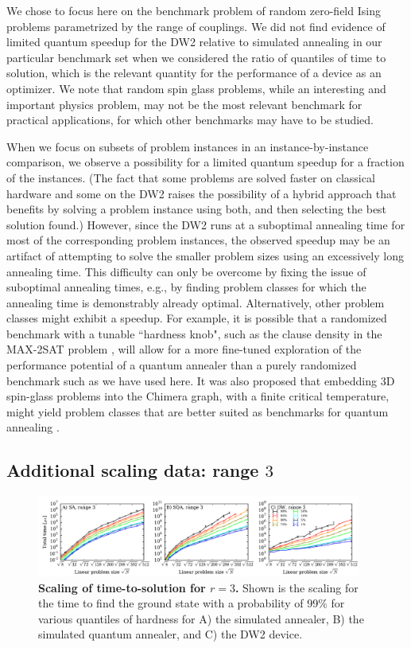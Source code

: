 We chose to focus here on the benchmark problem of random zero-field Ising problems parametrized by the range of couplings.
We did not find evidence of limited quantum speedup for the DW2 relative to simulated annealing in our particular benchmark set when we considered the ratio of quantiles of time to solution, which is the relevant quantity for the performance of a device as an optimizer. We note that random spin glass problems, while an interesting and important physics problem, may not be the most relevant benchmark for practical applications, for which other benchmarks may have to be studied.

When we focus on subsets of problem instances in an instance-by-instance comparison, we observe a possibility for a limited quantum speedup for a fraction of the instances. (The fact that some problems are solved faster on classical hardware and some on the DW2 raises the possibility of a hybrid approach that benefits by solving a problem instance using both, and then selecting the best solution found.) However, since the DW2 runs at a suboptimal annealing time for most of the corresponding problem instances, the observed speedup may be an artifact of attempting to solve the smaller problem sizes using  an excessively long annealing time. This difficulty can only be overcome by fixing the issue of suboptimal annealing times, e.g., by finding problem classes for which the annealing time is demonstrably already optimal.
Alternatively, other problem classes might exhibit a speedup. For example, it is possible that a randomized benchmark with a tunable ``hardness knob", such as the clause density in the MAX-2SAT problem \cite{MAX2SAT}, will allow for a more fine-tuned exploration of the performance potential of a quantum annealer than a purely randomized benchmark such as we have used here. It was also proposed that embedding 3D spin-glass problems into the Chimera graph, with a finite critical temperature, might yield problem classes that are better suited as benchmarks for quantum annealing \cite{2014Katzgraber}.

\subsection{Additional scaling data: range $3$}
\label{sec:scaling-all-ranges}

\begin{figure}[t]
\centering
\includegraphics[width=0.95\textwidth]{chapters/Speedup/sfigures/sfig04.pdf}
\caption{{\bf Scaling of time-to-solution for $r=3$.} Shown is the scaling for the time to find the ground state with a probability of 99\% for various quantiles of hardness for A) the simulated annealer, B) the simulated quantum annealer, and C) the DW2 device.}
\label{fig:scalingraw3}
\end{figure}

